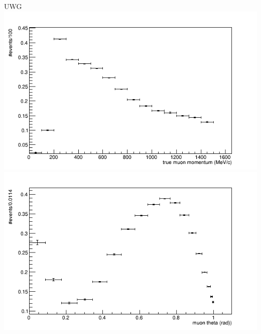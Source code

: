 \documentclass[%
 reprint,
 amsmath,amssymb,
 aps,
]{revtex4-2}
\begin{document}
\begin{frame}{UWG}
\center
\includegraphics[width=.45\textwidth]{images/Eff_selmu_true_mom_wgbm_topo_UWG_accum_level[][16]_data_mc.png}
\includegraphics[width=.45\textwidth]{images/Eff_selmu_true_costheta_wgbm_topo_UWG_accum_level[][16]_data_mc.png}
\end{frame}
\end{document}
